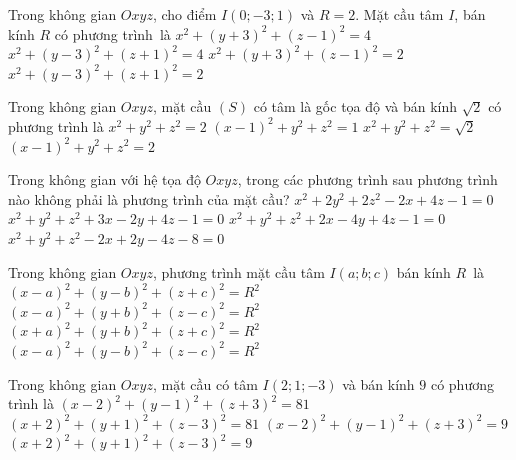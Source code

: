 \begin{ex}%
	Trong không gian $Oxyz$, cho điểm $I(0;-3;1)$ và $R=2$. Mặt cầu tâm  $I$, bán kính $R$ có phương trình~là
	 \choice
		{\True  $x^2 +(y+3)^2 +(z-1)^2=4$}
		{$x^2 +(y-3)^2 +(z+1)^2=4$} 
		{$x^2  +(y+3)^2 +(z-1)^2=2$}
		{$x^2  +(y-3)^2 +(z+1)^2=2$}
\end{ex}

\begin{ex}%
	Trong không gian $Oxyz$, mặt cầu $(S)$ có  tâm là gốc tọa độ và bán kính $\sqrt{2}$ có phương trình là
	 \choice
		{\True $x^{2}+y^{2}+z^{2}=2$} 
		 {$(x-1)^{2}+y^{2}+z^{2}=1$}
		 {$x^{2}+y^{2}+z^{2}=\sqrt{2}$}
		 {$(x-1)^{2}+y^{2}+z^{2}=2$}
\end{ex}

\begin{ex}%
	Trong không gian với hệ tọa độ $Oxyz$, trong các phương trình sau phương trình nào  không phải là phương trình của mặt cầu?
	\choice 
		{\True $x^2+2y^2+2z^2-2x+4z-1=0$} 
		{$x^2+y^2+z^2+3x-2y+4z-1=0$} 
		 {$x^2+y^2+z^2+2x-4y+4z-1=0$}
		{$x^2+y^2+z^2-2x+2y-4z-8=0$} 
\end{ex}

\begin{ex}%
	Trong không gian $ Oxyz$, phương trình mặt cầu tâm $I\left(a;b;c\right)$ bán  kính $R$~là
	\choice 
		 {$(x-a)^2+(y-b)^2+(z+c)^2=R^2$}
		 {$(x-a)^2+(y+b)^2+(z-c)^2=R^2$}
		 {$(x+a)^2+(y+b)^2+(z+c)^2=R^2$}
		{\True  $(x-a)^2+(y-b)^2+(z-c)^2=R^2$}
\end{ex}

\begin{ex}%
	Trong không gian $Oxyz$, mặt  cầu có tâm $I\left(2;1;-3\right)$ và bán kính $9$ có phương trình là
	\choice 
		 {\True $\left(x-2\right)^2+\left(y-1\right)^2+\left(z+3\right)^2=81$}
		{$\left(x+2\right)^2+\left(y+1\right)^2+\left(z-3\right)^2=81$} 
		{$\left(x-2\right)^2+\left(y-1\right)^2+\left(z+3\right)^2=9$} 
		{$\left(x+2\right)^2+\left(y+1\right)^2+\left(z-3\right)^2=9$} 
\end{ex}

